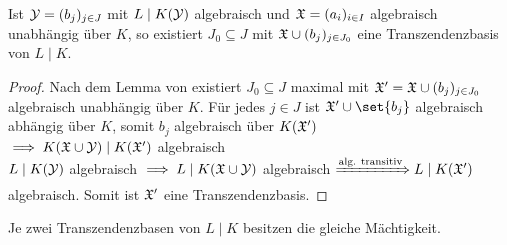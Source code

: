 \begin{lemma}
	Ist $\mathcal{Y} = (b_j)_{j \in J}$ mit $L\mid K(\mathcal{Y})$ algebraisch und $\mathfrak{X} = (a_i)_{i\in I}$ algebraisch unabhängig über $K$, so existiert $J_0 \subseteq J$ mit $\mathfrak{X} \cup (b_j)_{j \in J_0}$ eine Transzendenzbasis von $L \mid K$.
\end{lemma}
\begin{proof}
	Nach dem Lemma von  existiert $J_0 \subseteq J$ maximal mit $\mathfrak{X}' = \mathfrak{X} \cup (b_j)_{j \in J_0}$ algebraisch unabhängig über $K$. Für jedes $j \in J$ ist $\Halb' \cup \set{b_j}$ algebraisch abhängig über $K$, somit $b_j$ algebraisch über $K(\mathfrak{X}')$\\
	 $\implies K(\mathfrak{X} \cup \mathcal{Y}) \mid K(\mathfrak{X}')$ algebraisch\\
	$L \mid K(\mathcal{Y})$ algebraisch $\implies L\mid K(\mathfrak{X} \cup \mathcal{Y})$ algebraisch $\xRightarrow{\text{alg. transitiv}} L \mid K(\mathfrak{X}')$ algebraisch. Somit ist $\mathfrak{X}'$ eine Transzendenzbasis.
\end{proof}
\begin{theorem}[Steinitz, 1910]
	Je zwei Transzendenzbasen von $L \mid K$ besitzen die gleiche Mächtigkeit.
\end{theorem}
